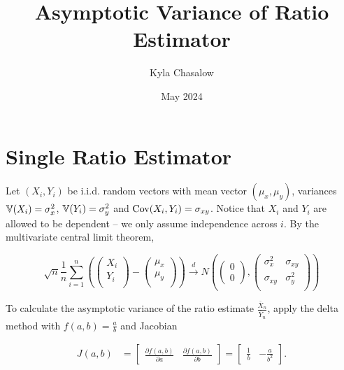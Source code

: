 \documentclass{article}
\title{Asymptotic Variance of Ratio Estimator}
\author{Kyla Chasalow}
\date{May 2024}
\begin{document}
\maketitle

\section{Single Ratio Estimator}

Let $(X_i,Y_i)$ be i.i.d. random vectors with mean vector $(\mu_x,\mu_y)$, variances $\mathbb{V}(X_i)=\sigma_x^2$, $\mathbb{V}(Y_i)=\sigma_y^2$ and $\mbox{Cov}(X_i,Y_i)=\sigma_{xy}$. Notice that $X_i$ and $Y_i$ are allowed to be dependent -- we only assume independence across $i$. By the multivariate central limit theorem, 

\begin{equation*} \sqrt{n} \frac{1}{n}\sum_{i=1}^{n}
    \left(\left(\begin{array}{c}
        X_i  \\
        Y_i  \\ 
    \end{array}\right) - \left(\begin{array}{c}
        \mu_x  \\
        \mu_y  \\ 
    \end{array}\right)\right) \xrightarrow{d}
    N\left(\left(\begin{array}{c}
        0  \\
        0 
    \end{array}\right),\left(\begin{array}{cc}
        \sigma_x^2  &  \sigma_{xy} \\
        \sigma_{xy} & \sigma_y^2 \\
    \end{array}\right)\right)
\end{equation*}

To calculate the asymptotic variance of the ratio estimate $\frac{\bar{X}_n}{\bar{Y}_n}$, apply the delta method with $f(a,b)=\frac{a}{b}$ and Jacobian

\begin{align*} 
J(a,b) &= \begin{bmatrix}
\frac{\partial f(a,b) }{\partial a} & \frac{\partial f(a,b) }{\partial b}
\end{bmatrix} = \begin{bmatrix}
\frac{1}{b} &  -\frac{a}{b^2}
\end{bmatrix}.
\end{align*}  
\end{document}
